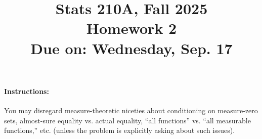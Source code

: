 \documentclass{article}
\theoremstyle{definition}
\begin{document}
\title{Stats 210A, Fall 2025\\
  Homework 2 \\
  {\large {\bf Due on}: Wednesday, Sep. 17}}
\date{}

\maketitle

\paragraph{Instructions:} You may disregard measure-theoretic niceties about conditioning on measure-zero sets, almost-sure equality vs. actual equality, ``all functions'' vs. ``all measurable functions,'' etc. (unless the problem is explicitly asking about such issues).
\end{document}
